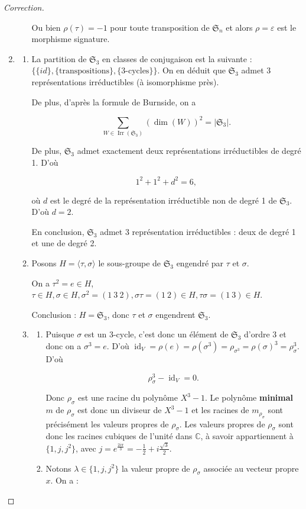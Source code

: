 \documentclass[french]{book}
\theoremstyle{definition}
\theoremstyle{remark}
\begin{document}
\begin{proof}[Correction]
\begin{enumerate}
\begin{enumerate}
      Ou bien \(\rho(\tau) = -1\) pour toute transposition de \(\mathfrak{S}_n\) et alors \(\rho = \varepsilon\) est le morphisme signature.
    \end{enumerate}
    \item
    \begin{enumerate}
      \item La partition de \(\mathfrak{S}_{3}\) en classes de conjugaison est la suivante : \(\{ \{ id \}, \{ \text{transpositions}\}, \{ 3\text{-cycles} \}\}\). On en déduit que \(\mathfrak{S}_{3}\) admet 3 représentations irréductibles (à isomorphisme près).

      De plus, d'après la formule de Burnside, on a

      \[\sum_{W \in \operatorname{Irr}(\mathfrak{S}_{3})} (\operatorname{dim}(W)) ^2 = \left\lvert \mathfrak{S}_{3} \right\rvert.\]

      De plus, \(\mathfrak{S}_{3}\) admet exactement deux représentations irréductibles de degré 1. D'où

      \[1 ^2 + 1 ^2+ d ^2 = 6,\]

      où \(d\) est le degré de la représentation irréductible non de degré 1 de \(\mathfrak{S}_{3}\).  D'où \(d=2\).

      En conclusion, \(\mathfrak{S}_{3}\) admet 3 représentation irréductibles : deux de degré 1 et une de degré 2.

      \item Posons \(H = \langle \tau, \sigma \rangle\) le sous-groupe de \(\mathfrak{S}_{3}\) engendré par \(\tau\) et \(\sigma\).

      On a \(\tau ^2 = e \in H\), \(\tau \in H, \sigma \in H, \sigma ^2 = (1 \ 3 \ 2), \sigma \tau = (1 \ 2)\in H, \tau \sigma = (1 \ 3)\in H\).

      Conclusion : \(H = \mathfrak{S}_{3}\), donc \(\tau\) et \(\sigma\) engendrent \(\mathfrak{S}_{3}\).

      \item
      \begin{enumerate}
        \item Puisque \(\sigma\) est un 3-cycle, c'est donc un élément de \(\mathfrak{S}_3\) d'ordre 3 et donc on a \(\sigma ^3 = e\). D'où \(\operatorname{id}_V = \rho(e) = \rho(\sigma ^3) = \rho _{\sigma ^3} = \rho(\sigma)^3 = \rho _{\sigma}^3\). D'où

        \[\rho _{\sigma} ^3 - \operatorname{id}_V = 0.\]

        Donc \(\rho _{\sigma}\) est une racine du polynôme \(X ^3-1\). Le polynôme \textbf{minimal} \(m\) de \(\rho _{\sigma}\) est donc un diviseur de \(X ^3 - 1\) et les racines de \(m _{\rho _{\sigma}}\) sont précisément les valeurs propres de \(\rho _{\sigma}\). Les valeurs propres de \(\rho _{\sigma}\) sont donc les racines cubiques de l'unité dans \(\mathbb{C}\), à savoir appartiennent à \(\{ 1, j, j ^2 \}\), avec \(j = e^{\frac{2i \pi}{3}} = - \frac{1}{2} + i \frac{\sqrt{ 3 }}{2}\).
        \item Notons \(\lambda \in \{ 1, j, j^2 \}\) la valeur propre de \(\rho _{\sigma}\) associée au vecteur propre \(x\). On a :


\end{enumerate}
\end{enumerate}
\end{enumerate}
\end{proof}
\end{document}

